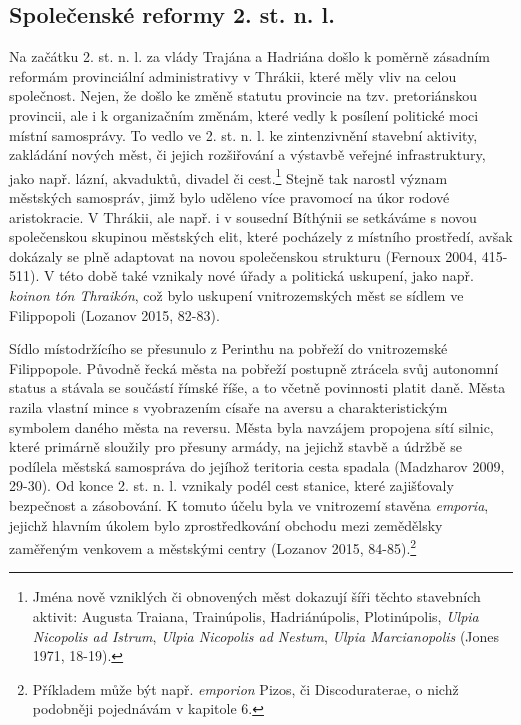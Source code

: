 \subsection[společenské-reformy-2.-st.-n.-l.]{Společenské reformy 2. st. n. l.}

Na začátku 2. st. n. l. za vlády Trajána a Hadriána došlo k poměrně zásadním reformám provinciální administrativy v Thrákii, které měly vliv na celou společnost. Nejen, že došlo ke změně statutu provincie na tzv. pretoriánskou provincii, ale i k organizačním změnám, které vedly k posílení politické moci místní samosprávy. To vedlo ve 2. st. n. l. ke zintenzivnění stavební aktivity, zakládání nových měst, či jejich rozšiřování a výstavbě veřejné infrastruktury, jako např. lázní, akvaduktů, divadel či cest.\footnote{Jména nově vzniklých či obnovených měst dokazují šíři těchto stavebních aktivit: Augusta Traiana, Trainúpolis, Hadriánúpolis, Plotinúpolis, {\em Ulpia Nicopolis ad Istrum}, {\em Ulpia Nicopolis ad Nestum}, {\em Ulpia Marcianopolis} (Jones 1971, 18-19).} Stejně tak narostl význam městských samospráv, jimž bylo uděleno více pravomocí na úkor rodové aristokracie. V Thrákii, ale např. i v sousední Bíthýnii se setkáváme s novou společenskou skupinou městských elit, které pocházely z místního prostředí, avšak dokázaly se plně adaptovat na novou společenskou strukturu (Fernoux 2004, 415-511). V této době také vznikaly nové úřady a politická uskupení, jako např. {\em koinon tón Thraikón}, což bylo uskupení vnitrozemských měst se sídlem ve Filippopoli (Lozanov 2015, 82-83).

Sídlo místodržícího se přesunulo z Perinthu na pobřeží do vnitrozemské Filippopole. Původně řecká města na pobřeží postupně ztrácela svůj autonomní status a stávala se součástí římské říše, a to včetně povinnosti platit daně. Města razila vlastní mince s vyobrazením císaře na aversu a charakteristickým symbolem daného města na reversu. Města byla navzájem propojena sítí silnic, které primárně sloužily pro přesuny armády, na jejichž stavbě a údržbě se podílela městská samospráva do jejíhož teritoria cesta spadala (Madzharov 2009, 29-30). Od konce 2. st. n. l. vznikaly podél cest stanice, které zajišťovaly bezpečnost a zásobování. K tomuto účelu byla ve vnitrozemí stavěna {\em emporia}, jejichž hlavním úkolem bylo zprostředkování obchodu mezi zemědělsky zaměřeným venkovem a městskými centry (Lozanov 2015, 84-85).\footnote{Příkladem může být např. {\em emporion} Pizos, či Discoduraterae, o nichž podobněji pojednávám v kapitole 6.}

